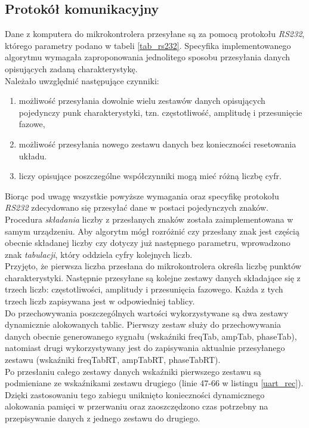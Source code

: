 \subsection{Protokół komunikacyjny}
\label{PK}
Dane z komputera do mikrokontrolera przesyłane są za pomocą protokołu \textit{RS232}, którego parametry podano w tabeli \ref{tab_rs232}. Specyfika implementowanego algorytmu wymagała zaproponowania jednolitego sposobu przesyłania danych opisujących zadaną charakterystykę. \\
Należało uwzględnić następujące czynniki:
\begin{enumerate}
	
	\item możliwość przesyłania dowolnie wielu zestawów danych opisujących pojedynczy punk charakterystyki, tzn. częstotliwość, amplitudę i przesunięcie fazowe,
	\item możliwość przesyłania nowego zestawu danych bez konieczności resetowania układu.
	\item liczy opisujące poszczególne współczynniki mogą mieć różną liczbę cyfr.
\end{enumerate}
%
%
Biorąc pod uwagę wszystkie powyższe wymagania oraz specyfikę protokołu \textit{RS232} zdecydowano się przesyłać dane w postaci pojedynczych znaków. Procedura \textit{składania} liczby z przesłanych znaków została zaimplementowana w samym urządzeniu. Aby algorytm mógł rozróżnić czy przesłany znak jest częścią obecnie składanej liczby czy dotyczy już następnego parametru, wprowadzono znak \textit{tabulacji}, który oddziela cyfry kolejnych liczb.
\\
Przyjęto, że pierwsza liczba przesłana do mikrokontrolera określa liczbę punktów charakterystyki. Następnie przesyłane są kolejne zestawy danych składające się z trzech liczb: częstotliwości, amplitudy i przesunięcia fazowego. Każda z tych trzech liczb zapisywana jest w odpowiedniej tablicy.
\\
Do przechowywania poszczególnych wartości wykorzystywane są dwa zestawy dynamicznie alokowanych tablic. Pierwszy zestaw służy do przechowywania danych obecnie generowanego sygnału (wska\'zniki freqTab, ampTab, phaseTab), natomiast drugi wykorzystywany jest do zapisywania aktualnie przesyłanego zestawu (wska\'zniki freqTabRT, ampTabRT, phaseTabRT). 
\\
Po przesłaniu całego zestawy danych wska\'zniki pierwszego zestawu są podmieniane ze wska\'znikami zestawu drugiego (linie 47-66 w listingu \ref{uart_rec}). Dzięki zastosowaniu tego zabiegu uniknięto konieczności dynamicznego alokowania pamięci w przerwaniu oraz zaoszczędzono czas potrzebny na przepisywanie danych z jednego zestawu do drugiego. 
